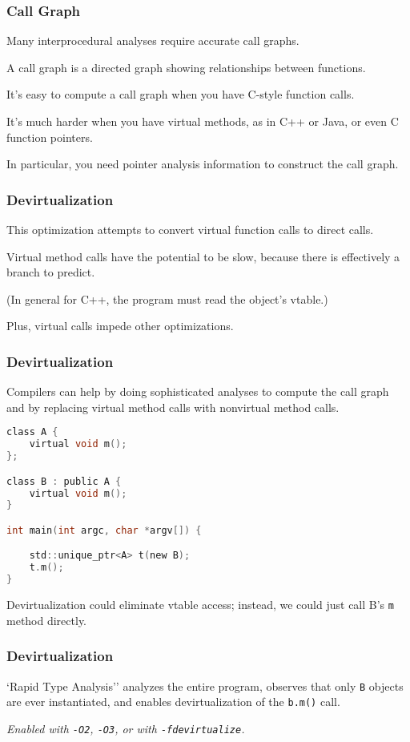 \begin{frame}
\frametitle{Call Graph}
Many interprocedural analyses require accurate call graphs. 

A \alert{call graph} is a directed graph showing relationships between
functions. 

It's easy to compute a call graph when you have C-style
function calls. 

It's much harder when you have virtual methods, as in
C++ or Java, or even C function pointers. 

In particular, you need pointer
analysis information to construct the call graph.


\end{frame}


\begin{frame}
\frametitle{Devirtualization}

This optimization attempts to convert virtual function calls to direct calls.  

Virtual method calls have the potential to be slow, because there is effectively a branch to predict. 

(In general for C++, the program must read the object's vtable.) 

Plus, virtual calls impede other optimizations.

\end{frame}

\begin{frame}[fragile]
\frametitle{Devirtualization}

Compilers can help by doing sophisticated analyses to compute the call graph and by replacing virtual method calls with nonvirtual method calls.  


  \begin{lstlisting}[language=C]
class A {
    virtual void m();
};

class B : public A {
    virtual void m();
}

int main(int argc, char *argv[]) {

    std::unique_ptr<A> t(new B);
    t.m();
}
  \end{lstlisting}

Devirtualization could eliminate vtable access; instead, we could just call B's {\tt m} method
directly.

\end{frame}

\begin{frame}
\frametitle{Devirtualization}

`Rapid Type Analysis'' analyzes the entire program, observes that
only {\tt B} objects are ever instantiated, and enables devirtualization
of the {\tt b.m()} call.

\emph{Enabled with {\tt -O2}, {\tt -O3}, or with {\tt -fdevirtualize}.}

\end{frame}

